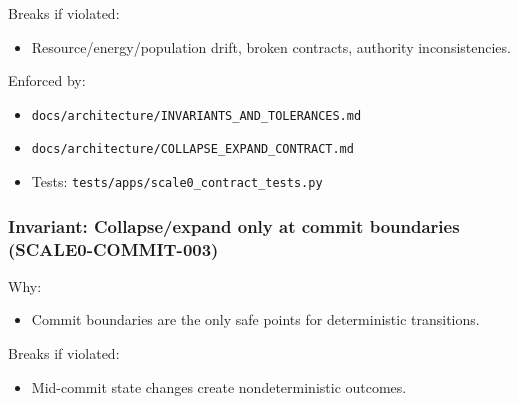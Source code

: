 \documentclass[9pt,a4paper,openany]{book}
\begin{document}
Breaks if violated:



\begin{itemize}
\item Resource/\allowbreak{}energy/\allowbreak{}population drift, broken contracts, authority inconsistencies.\allowbreak{}
\end{itemize}


Enforced by:



\begin{itemize}
\item \texttt{docs/\allowbreak{}architecture/\allowbreak{}INVARIANTS\_\allowbreak{}AND\_\allowbreak{}TOLERANCES.\allowbreak{}md}
\end{itemize}


\begin{itemize}
\item \texttt{docs/\allowbreak{}architecture/\allowbreak{}COLLAPSE\_\allowbreak{}EXPAND\_\allowbreak{}CONTRACT.\allowbreak{}md}
\end{itemize}


\begin{itemize}
\item Tests: \texttt{tests/\allowbreak{}apps/\allowbreak{}scale0\_\allowbreak{}contract\_\allowbreak{}tests.\allowbreak{}py}
\end{itemize}





\subsubsection{Invariant: Collapse/expand only at commit boundaries (SCALE0-COMMIT-003)}


Why:



\begin{itemize}
\item Commit boundaries are the only safe points for deterministic transitions.\allowbreak{}
\end{itemize}


Breaks if violated:



\begin{itemize}
\item Mid-\allowbreak{}commit state changes create nondeterministic outcomes.\allowbreak{}
\end{itemize}
\end{document}
